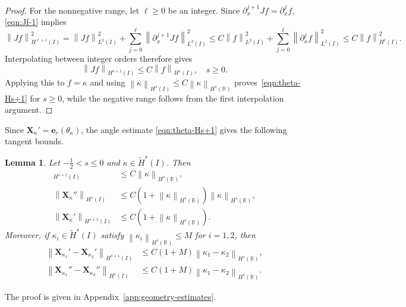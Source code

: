 \documentclass[11pt,reqno]{amsart}
\theoremstyle{plain}
\newtheorem{lemma}[theorem]{Lemma}
\theoremstyle{definition}
\numberwithin{equation}{section}
\newcommand{\paren}[1]{\left(#1\right)}
\newcommand{\wt}[1]{\widetilde{#1}}
\newcommand{\bm}[1]{\boldsymbol{#1}}
\newcommand{\norm}[1]{\left\lVert #1 \right\rVert}
\newcommand{\R}{\mathbb{R}}
\newcommand{\xk}{\bm X_\kappa}
\newcommand{\xka}[1]{\bm X_{\kappa_{#1}}}
\newcommand{\hi}[1]{H^{#1}(I)}
\newcommand{\thi}[1]{\wt H^{#1}(I)}
\newcommand{\hr}[1]{H^{#1}(\R)}
\begin{document}
\begin{proof}
For the nonnegative range, let $\ell\ge0$ be an integer. Since
$\partial_x^{j+1}Jf=\partial_x^j f$, \eqref{eqn:Jf-1} implies
\begin{equation}
    \norm{Jf}_{\hi{\ell+1}}^2 = \norm{Jf}_{L^2(I)}^2 + \sum_{j=0}^{\ell}\norm{\partial_x^{j+1}Jf}_{L^2(I)}^2 \le
    C \norm{f}_{L^2(I)}^2 + \sum_{j=0}^{\ell}\norm{\partial_x^j f}_{L^2(I)}^2 \le C \norm{f}_{\hi{\ell}}^2.
\end{equation}
Interpolating between integer orders therefore gives
\begin{equation}
    \norm{Jf}_{\hi{s+1}} \le C\norm{f}_{\hi{s}},
    \quad s\ge 0.
\end{equation}
Applying this to $f=\kappa$ and using $\norm{\kappa}_{\hi{s}}\le C\norm{\kappa}_{\hr{s}}$
proves~\eqref{eqn:theta-Hs+1} for $s\ge0$, while the negative range follows
from the first interpolation argument.
\end{proof}

Since $\xk'=\bm e_r(\theta_\kappa)$, the angle estimate
\eqref{eqn:theta-Hs+1} gives the following tangent bounds.

\begin{lemma}\label{tau-n-est}
Let $-\frac{1}{2}<s\le 0$ and $\kappa\in \thi{s}$. Then
\begin{align}
    [\xk']_{\hi{s+1}} &\le C\norm{\kappa}_{\hr{s}},\\
    \norm{\xk''}_{\hi{s}} &\le C\paren{1+\norm{\kappa}_{\hr{s}}}\norm{\kappa}_{\hr{s}},\\
    \norm{\xk'}_{\hi{s+1}} &\le C\paren{1+\norm{\kappa}_{\hr{s}}}.\label{eqn:tangent-Sobolev-bound}
\end{align}
Moreover, if $\kappa_i\in \thi{s}$ satisfy
$\norm{\kappa_i}_{\hr{s}}\le M$ for $i=1,2$, then
\begin{align}
    \norm{\xka{1}'-\xka{2}'}_{\hi{s+1}}
    &\le C\paren{1+M} \norm{\kappa_1-\kappa_2}_{\hr{s}},\\
    \norm{\xka{1}''-\xka{2}''}_{\hi{s}}
    &\le C\paren{1+M} \norm{\kappa_1-\kappa_2}_{\hr{s}}.
\end{align}
\end{lemma}

The proof is given in Appendix~\ref{app:geometry-estimates}.
\end{document}
